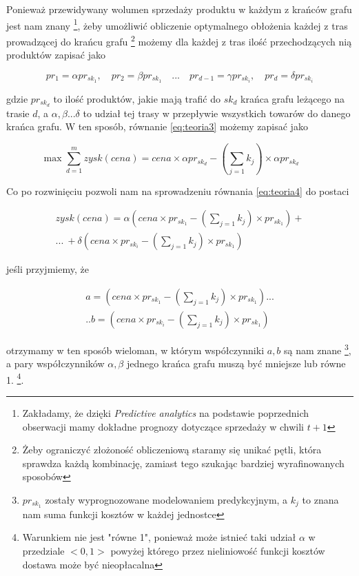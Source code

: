 \documentclass[polish, twoside, 12pt, a4paper]{article}
\theoremstyle{definition}
\theoremstyle{plain}
\theoremstyle{remark}
\begin{document}
Ponieważ przewidywany wolumen sprzedaży produktu w każdym z krańców grafu jest nam znany \footnote{Zakładamy, że dzięki \textit{Predictive analytics} na podstawie poprzednich obserwacji mamy dokładne prognozy dotyczące sprzedaży w chwili $t+1$}, żeby umożliwić obliczenie optymalnego obłożenia każdej z tras prowadzącej do krańcu grafu \footnote{Żeby ograniczyć złożoność obliczeniową staramy się unikać pętli, która sprawdza każdą kombinację, zamiast tego szukając bardziej wyrafinowanych sposobów} możemy dla każdej z tras ilość przechodzących nią produktów zapisać jako 

\begin{equation*}
pr_1 = \alpha pr_{sk_1} , \quad pr_2 = \beta pr_{sk_1} \quad ... \quad  pr_{d-1} = \gamma pr_{sk_i} ,\quad  pr_d = \delta  pr_{sk_i}
\end{equation*}

gdzie $pr_{sk_d}$ to ilość produktów, jakie mają trafić do $sk_d$ krańca grafu leżącego na trasie $d$, a $\alpha,\beta...\delta$ to udział tej trasy w przepływie wszystkich towarów do danego krańca grafu. W ten sposób, równanie  \ref{eq:teoria3} możemy zapisać jako 

\begin{equation} \label{eq:teoria4}
\max \sum\limits_{d=1}^m  zysk(cena) = 
cena \times \alpha pr_{sk_d}-  ( \sum\limits_{j=1} k_j) \times \alpha pr_{sk_d} \qquad 
\end{equation}

Co po rozwinięciu pozwoli nam na sprowadzeniu równania \ref{eq:teoria4} do postaci

\begin{multline} \label{eq:teoria5}
zysk(cena) = \alpha(cena \times pr_{sk_1} - ( \sum\limits_{j=1} k_j) \times pr_{sk_1}) + \\
 ... \ + \delta(cena \times pr_{sk_i} - ( \sum\limits_{j=1} k_j) \times pr_{sk_1})
\end{multline}


jeśli przyjmiemy, że  

\begin{multline*}
a = (cena \times pr_{sk_1} - ( \sum\limits_{j=1} k_j) \times pr_{sk_1}) ... \\
.. b=(cena \times pr_{sk_i} - ( \sum\limits_{j=1} k_j) \times pr_{sk_1})
\end{multline*}

otrzymamy w ten sposób wieloman, w którym współczynniki $a,b$ są nam znane \footnote{$pr_{sk_1}$ zostały wyprognozowane modelowaniem predykcyjnym, a $k_j$ to znana nam suma funkcji kosztów w każdej jednostce}, a pary współczynników $\alpha, \beta$ jednego krańca grafu muszą być mniejsze lub równe 1. \footnote{Warunkiem nie jest "równe 1", ponieważ może istnieć taki udział $\alpha$ w przedziale $<0,1>$ powyżej którego przez nieliniowość funkcji kosztów dostawa może być nieopłacalna}. 
\end{document}
